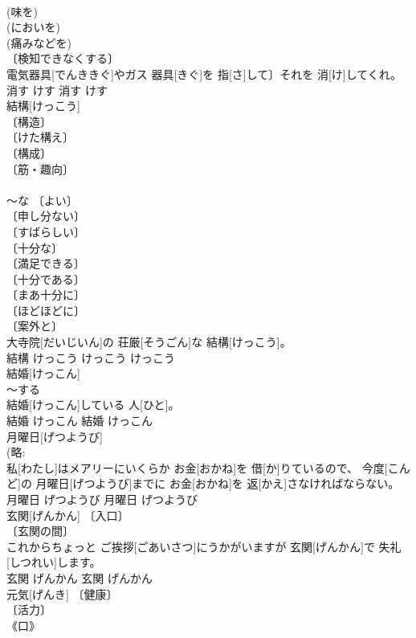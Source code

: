 \documentclass[8pt]{extreport}
\begin{document}
\begin{CJK}{UTF8}{min}
\\	(味を) 
\\	(においを) 
\\	(痛みなどを) 
\\	〔検知できなくする〕 
\\	電気器具[でんききぐ]やガス 器具[きぐ]を 指[さ]して〕それを 消[け]してくれ。	
\\	消す	けす	消す	けす	
\\	結構[けっこう]	
\\	〔構造〕 
\\	〔けた構え〕 
\\	〔構成〕 
\\	〔筋・趣向〕 
\\	[⇒こうぞう, こうせい１９] 
\\	～な 〔よい〕 
\\	〔申し分ない〕 
\\	〔すばらしい〕 
\\	〔十分な〕 
\\	〔満足できる〕 
\\	〔十分である〕 
\\	〔まあ十分に〕 
\\	〔ほどほどに〕 
\\	〔案外と〕 
\\	大寺院[だいじいん]の 荘厳[そうごん]な 結構[けっこう]。	
\\	結構	けっこう	けっこう	けっこう	
\\	結婚[けっこん]	
\\	～する 
\\	結婚[けっこん]している 人[ひと]。	
\\	結婚	けっこん	結婚	けっこん	
\\	月曜日[げつようび]	
\\	(略: 
\\	私[わたし]はメアリーにいくらか お金[おかね]を 借[か]りているので、 今度[こんど]の 月曜日[げつようび]までに お金[おかね]を 返[かえ]さなければならない。	
\\	月曜日	げつようび	月曜日	げつようび	
\\	玄関[げんかん]	〔入口〕 
\\	〔玄関の間〕 
\\	これからちょっと ご挨拶[ごあいさつ]にうかがいますが 玄関[げんかん]で 失礼[しつれい]します。	
\\	玄関	げんかん	玄関	げんかん	
\\	元気[げんき]	〔健康〕 
\\	〔活力〕 
\\	《口》 

\end{CJK}
\end{document}
